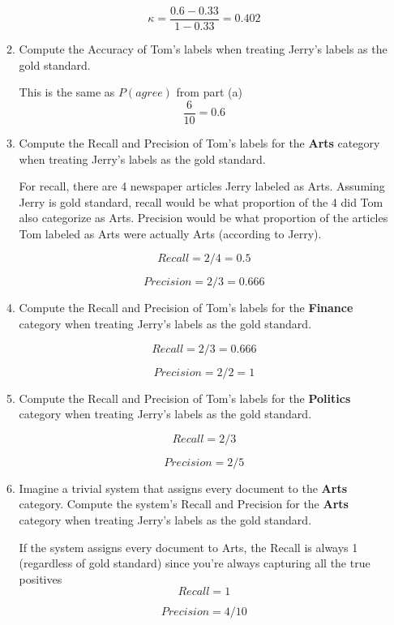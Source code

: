 \documentclass[11pt]{article}
\begin{document}
\begin{enumerate}
\begin{enumerate}
  $$\kappa = \frac{0.6-0.33}{1-0.33} = 0.402$$

\item Compute the Accuracy of Tom's labels when treating Jerry's
  labels as the gold standard. 
  
  This is the same as $P(agree)$ from part (a)  
  $$\frac{6}{10} = 0.6$$
  

\item Compute the Recall and Precision of Tom's labels for the {\bf Arts} category when
 treating Jerry's labels as the gold standard. 
 
 For recall, there are 4 newspaper articles Jerry labeled as Arts. Assuming Jerry is gold standard, recall would be what proportion of the 4 did Tom also categorize as Arts. Precision would be what proportion of the articles Tom labeled as Arts were actually Arts (according to Jerry).
 
 $$Recall = 2/4 = 0.5$$
 
 $$Precision = 2 / 3 = 0.666$$

\item Compute the Recall and Precision of Tom's labels for the {\bf Finance} category when
 treating Jerry's labels as the gold standard. 
 
 $$Recall = 2/3 = 0.666$$
 
 $$Precision = 2/2 = 1$$

\item Compute the Recall and Precision of Tom's labels for the {\bf Politics} category
  when treating Jerry's labels as the gold standard.  
  
  $$Recall = 2/3$$
  
  $$Precision = 2/5$$

\item Imagine a trivial system  that assigns  every document to the
  {\bf Arts} category. Compute the system's Recall and Precision for the {\bf
    Arts} category when treating Jerry's labels as the gold standard.
    
  If the system assigns every document to Arts, the Recall is always 1 (regardless of gold standard) since you're always capturing all the true positives  
  $$Recall = 1$$
  
  $$Precision = 4/10$$

\end{enumerate}


\newpage


\end{enumerate}
\end{document}
